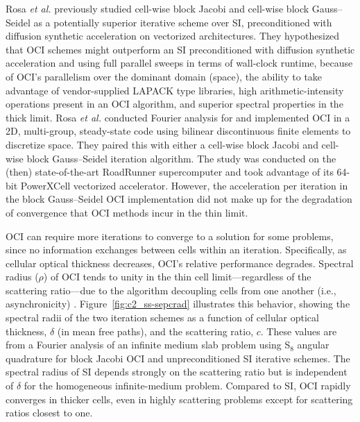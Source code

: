 Rosa \textit{et al.} \cite{rosa_cellwise_2013} previously studied cell-wise block Jacobi and cell-wise block Gauss--Seidel as a potentially superior iterative scheme over SI, preconditioned with diffusion synthetic acceleration on vectorized architectures.
They hypothesized that OCI schemes might outperform an SI preconditioned with diffusion synthetic acceleration and using full parallel sweeps in terms of wall-clock runtime, because of OCI's parallelism over the dominant domain (space), the ability to take advantage of vendor-supplied LAPACK type libraries, high arithmetic-intensity operations present in an OCI algorithm, and superior spectral properties in the thick limit.
Rosa \textit{et al.} conducted Fourier analysis for and implemented OCI in a 2D, multi-group, steady-state code using bilinear discontinuous finite elements to discretize space.
They paired this with either a cell-wise block Jacobi and cell-wise block Gauss--Seidel iteration algorithm.
The study was conducted on the (then) state-of-the-art RoadRunner supercomputer and took advantage of its 64-bit PowerXCell vectorized accelerator.
However, the acceleration per iteration in the block Gauss--Seidel OCI implementation did not make up for the degradation of convergence that OCI methods incur in the thin limit.

OCI can require more iterations to converge to a solution for some problems, since no information exchanges between cells within an iteration.
Specifically, as cellular optical thickness decreases, OCI's relative performance degrades. %
Spectral radius ($\rho$) of OCI tends to unity in the thin cell limit---regardless of the scattering ratio---due to the algorithm decoupling cells from one another (i.e., asynchronicity) \cite{rosa_cellwise_2013, hoagland_hybrid_2021, man1994parallel}. 
Figure~\ref{fig:c2_ss-sepcrad} illustrates this behavior, showing the spectral radii of the two iteration schemes as a function of cellular optical thickness, $\delta$ (in mean free paths), and the scattering ratio, $c$.
These values are from a Fourier analysis of an infinite medium slab problem using S$_{8}$ angular quadrature for block Jacobi OCI and unpreconditioned SI iterative schemes.
The spectral radius of SI depends strongly on the scattering ratio but is independent of $\delta$ for the homogeneous infinite-medium problem. 
Compared to SI, OCI rapidly converges in thicker cells, even in highly scattering problems except for scattering ratios closest to one.

